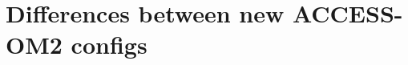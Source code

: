 \documentclass[10pt]{article}
\newcommand{\nmldiffer}[1]{#1} %
\newcommand{\doscript}[1]{{\footnotesize\textsf{}}}
\begin{document}




\tableofcontents

%
%

%


\newpage
\renewcommand{\nmldiffer}[1]{#1} %
\section{Differences between new ACCESS-OM2 configs}
\doscript{/Users/andy/anaconda/bin/python3 /Users/andy/bin/nmltab.py -d --format latex new_accessom2_1deg_jra55_ryf_input.nml new_accessom2_025deg_jra55_ryf_input.nml new_accessom2_01deg_jra55_ryf_input.nml}
\end{document}
